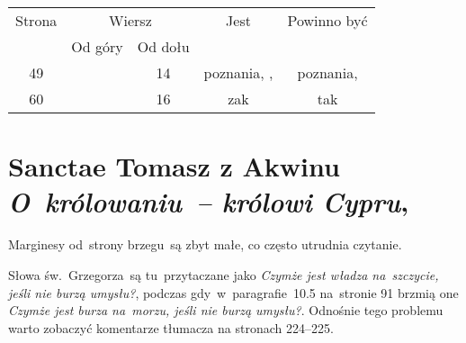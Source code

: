 \documentclass[a4paper,11pt]{article}
\numberwithin{equation}{section}
\begin{document}
\begin{center}
  \newpage

  \begin{tabular}{|c|c|c|c|c|}
    \hline
    Strona & \multicolumn{2}{c|}{Wiersz} & Jest
                              & Powinno być \\ \cline{2-3}
    & Od góry & Od dołu & & \\
    \hline
    49 & & 14 & poznania,{ }, & poznania, \\
    60 & & 16 & zak & tak \\
    \hline
  \end{tabular}

\end{center}

\VerSpaceTwo













\section{Sanctae Tomasz z Akwinu
  \textit{O~królowaniu~-- królowi Cypru},
  \parencite{SancteTomaszZAkwinuOKrolowaniu2006}}




\vspace{0em}


\noindent
Marginesy od~strony brzegu~są zbyt małe, co często utrudnia czytanie.







\vspace{0em}


\noindent
{} Słowa św.~Grzegorza~są tu~przytaczane jako
\textit{Czymże jest władza na~szczycie, jeśli nie burzą umysłu?},
podczas gdy~w~paragrafie~10.5 na~stronie 91 brzmią one \textit{Czymże
  jest burza na~morzu, jeśli nie burzą umysłu?}. Odnośnie tego
problemu warto zobaczyć komentarze tłumacza na stronach 224--225.
\end{document}
